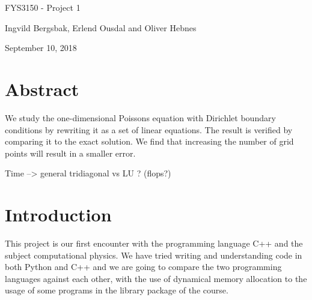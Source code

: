 \documentclass[%
oneside,                 %
final,                   %
10pt]{article}
\begin{document}



\newcommand{\exercisesection}[1]{\subsection*{#1}}






\thispagestyle{empty}

\begin{center}
{\LARGE\bf
\begin{spacing}{1.25}
FYS3150 - Project 1
\end{spacing}
}
\end{center}



\begin{center}
\centerline{{\small Ingvild Bergsbak, Erlend Ousdal and Oliver Hebnes}}
\end{center}



\begin{center}
September 10, 2018
\end{center}

\vspace{1cm}

\newpage{}


\section{Abstract}

We study the one-dimensional Poissons equation with Dirichlet boundary conditions by rewriting it as a set of linear equations.
The result is verified by comparing it to the exact solution. We find that increasing the number of grid points
will result in a smaller error.

Time --> general tridiagonal vs LU ?  (flops?)

\section{Introduction}

This project is our first encounter with the programming language C++ and the subject computational physics.
We have tried writing and understanding code in both Python and C++ and we are going to compare the two programming languages against each other, with
the use of dynamical memory allocation to the usage of some programs in the library package of the course.
\end{document}
